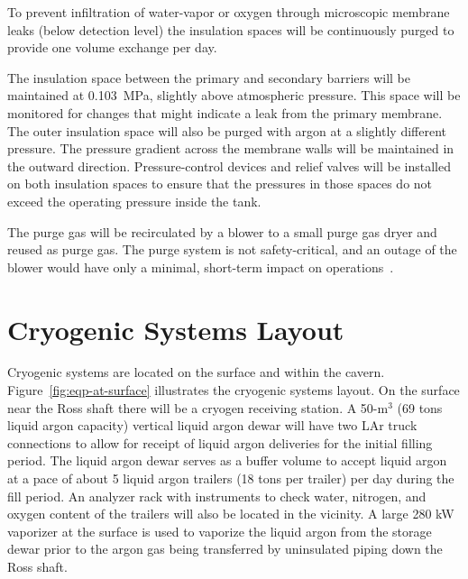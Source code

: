 
To prevent infiltration of water-vapor or oxygen through microscopic membrane leaks (below detection level) the insulation spaces will be continuously purged to provide one volume exchange per day.  

The insulation space between the primary and 
secondary barriers will be maintained at 0.103~MPa, slightly above atmospheric pressure.  
This space will be monitored for changes that might indicate a leak from the primary membrane.  The outer insulation space will also be purged with argon at a slightly different pressure. The pressure gradient across the membrane walls will be maintained in the outward direction.  Pressure-control devices and relief valves will be installed on both insulation spaces to ensure that the pressures in those spaces do not exceed the operating pressure inside the tank.

The purge gas will be recirculated by a blower to a small purge gas dryer and reused as purge gas. 
The purge system is not safety-critical, and an outage of the blower would have only a minimal, short-term impact on operations~\cite{docdb4303}.

\section{Cryogenic Systems Layout}
\label{sec:cryosys-layout}

Cryogenic systems are located on the surface and within the cavern. Figure~\ref{fig:eqp-at-surface}  illustrates the cryogenic systems layout. On the surface near the Ross shaft there will be a
cryogen receiving station. A 50-m$^3$
(69 tons liquid argon capacity) vertical liquid argon dewar
will have two LAr truck connections to allow for receipt of liquid argon deliveries for
the initial
filling period. The liquid argon dewar serves as a buffer volume to accept liquid argon at a pace
of about 5 liquid argon trailers (18 tons per trailer) per day during the fill period. An analyzer
rack with instruments to check water, nitrogen, and oxygen content of the trailers will also be
located in the vicinity. A large 280 kW vaporizer at the surface is used to vaporize the liquid
argon from the storage dewar prior to the argon gas being transferred by uninsulated piping
down the Ross shaft.


